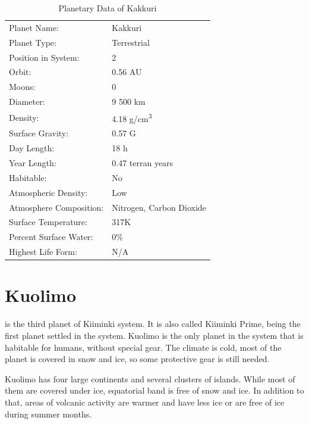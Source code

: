 \documentclass{tufte-book}
\begin{document}
\bigskip
\begin{table}
\begin{minipage}{\textwidth}
\begin{center}
\begin{tabular}{ll}
\toprule
Planet Name: & Kakkuri \\
Planet Type: & Terrestrial \\
Position in System: & 2 \\
Orbit: & 0.56 AU \\
Moons: & 0 \\
Diameter: & 9 500 km \\
Density: & 4.18 g/cm\textsuperscript{3} \\
Surface Gravity: & 0.57 G \\
Day Length: & 18 h \\
Year Length: & 0.47 terran years \\
Habitable: & No \\
\quad Atmospheric Density: & Low \\
\quad Atmosphere Composition: & Nitrogen, Carbon Dioxide \\
\quad Surface Temperature: & 317K \\
\quad Percent Surface Water: & 0\% \\
\quad Highest Life Form: & N/A \\

\bottomrule
\end{tabular}
\end{center}
\end{minipage}
\caption{Planetary Data of Kakkuri}
\end{table}

\section{Kuolimo}

 is the third planet of Kiiminki system. It is also
called Kiiminki Prime, being the first planet settled in the system.
Kuolimo is the only planet in the system that is habitable for humans,
without special gear. The climate is cold, most of the planet is covered
in snow and ice, so some protective gear is still needed.

Kuolimo has four large continents and several clusters of islands. While
most of them are covered under ice, equatorial band is free of snow and
ice. In addition to that, areas of volcanic activity are warmer and have
less ice or are free of ice during summer months.
\end{document}
